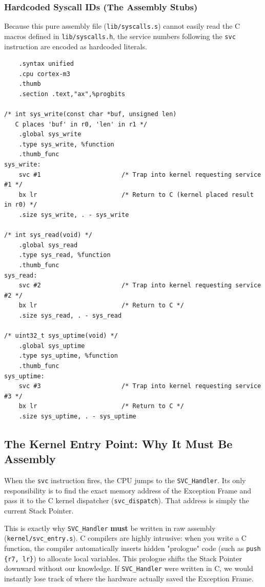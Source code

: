\subsubsection*{Hardcoded Syscall IDs (The Assembly Stubs)}
Because this pure assembly file (\texttt{lib/syscalls.s}) cannot easily read the C macros defined in \texttt{lib/syscalls.h}, the service numbers following the \texttt{svc} instruction are encoded as hardcoded literals. 

\begin{lstlisting}
    .syntax unified
    .cpu cortex-m3
    .thumb
    .section .text,"ax",%progbits

/* int sys_write(const char *buf, unsigned len) 
   C places 'buf' in r0, 'len' in r1 */
    .global sys_write
    .type sys_write, %function
    .thumb_func
sys_write:
    svc #1                      /* Trap into kernel requesting service #1 */
    bx lr                       /* Return to C (kernel placed result in r0) */
    .size sys_write, . - sys_write

/* int sys_read(void) */
    .global sys_read
    .type sys_read, %function
    .thumb_func
sys_read:
    svc #2                      /* Trap into kernel requesting service #2 */
    bx lr                       /* Return to C */
    .size sys_read, . - sys_read

/* uint32_t sys_uptime(void) */
    .global sys_uptime
    .type sys_uptime, %function
    .thumb_func
sys_uptime:
    svc #3                      /* Trap into kernel requesting service #3 */
    bx lr                       /* Return to C */
    .size sys_uptime, . - sys_uptime
\end{lstlisting}

\subsection{The Kernel Entry Point: Why It Must Be Assembly}
When the \texttt{svc} instruction fires, the CPU jumps to the \texttt{SVC\_Handler}. Its only responsibility is to find the exact memory address of the Exception Frame and pass it to the C kernel dispatcher (\texttt{svc\_dispatch}). That address is simply the current Stack Pointer.

This is exactly why \texttt{SVC\_Handler} \textbf{must} be written in raw assembly (\texttt{kernel/svc\_entry.s}). C compilers are highly intrusive: when you write a C function, the compiler automatically inserts hidden "prologue" code (such as \texttt{push \{r7, lr\}}) to allocate local variables. This prologue shifts the Stack Pointer downward without our knowledge. If \texttt{SVC\_Handler} were written in C, we would instantly lose track of where the hardware actually saved the Exception Frame.

